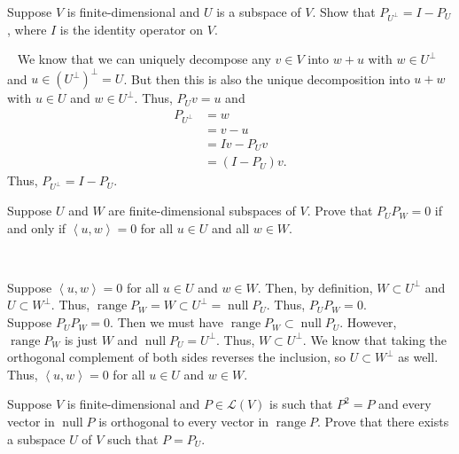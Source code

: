 \documentclass[12 pt, letterpaper]{hmcpset}
\begin{document}
\pagebreak

\begin{problem}[5]
	Suppose $V$ is finite-dimensional and $U$ is a subspace of $V$. Show that $P_{U^{\perp}} = I - P_{U}$, where $I$ is the identity operator on $V$.
\end{problem}

\begin{solution}~
	We know that we can uniquely decompose any $v \in V$ into $w + u$ with $w \in U^{\perp}$ and $u \in (U^{\perp})^{\perp} = U$. But then this is also the unique decomposition into $u + w$ with $u \in U$ and $w \in U^{\perp}$. Thus, $P_{U} v = u$ and
	\[
		\begin{split}
			P_{U^{\perp}} & = w \\
				      & = v - u \\
				      & = I v - P_{U} v \\
				      & = (I - P_{U}) v.
		\end{split}
	\]
	Thus, $P_{U^{\perp}} = I - P_{U}$.
\end{solution}

\pagebreak

\begin{problem}[6]
	Suppose $U$ and $W$ are finite-dimensional subspaces of $V$. Prove that $P_{U} P_{W} = 0$ if and only if $\left < u, w \right > = 0$ for all $u \in U$ and all $w \in W$.
\end{problem}

\begin{solution}~

	Suppose $\left < u, w \right > = 0$ for all $u \in U$ and $w \in W$. Then, by definition, $W \subset U^{\perp}$ and $U \subset W^{\perp}$. Thus, $\operatorname{range} P_{W} = W \subset U^{\perp} = \operatorname{null} P_{U}$. Thus, $P_{U} P_{W} = 0$. \\

	Suppose $P_{U} P_{W} = 0$. Then we must have $\operatorname{range} P_{W} \subset \operatorname{null} P_{U}$. However, $\operatorname{range} P_{W}$ is just $W$ and $\operatorname{null} P_{U} = U^{\perp}$. Thus, $W \subset U^{\perp}$. We know that taking the orthogonal complement of both sides reverses the inclusion, so $U \subset W^{\perp}$ as well. Thus, $\left < u, w \right > = 0$ for all $u \in U$ and $w \in W$.
\end{solution}

\pagebreak

\begin{problem}[7]
	Suppose $V$ is finite-dimensional and $P \in \mathcal{L}(V)$ is such that $P^{2} = P$ and every vector in $\operatorname{null} P$ is orthogonal to every vector in $\operatorname{range} P$. Prove that there exists a subspace $U$ of $V$ such that $P = P_{U}$.
\end{problem}
\end{document}
